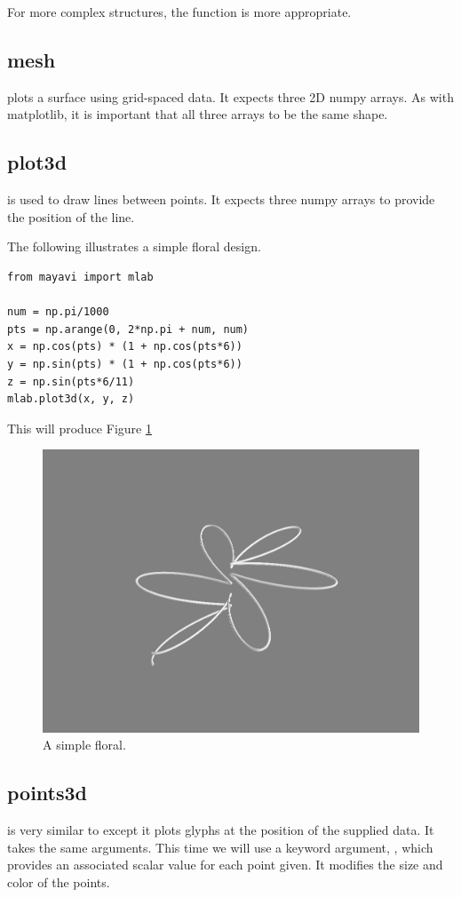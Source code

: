 For more complex structures, the  function is more appropriate. 

\subsection*{mesh}
 plots a surface using grid-spaced data. 
It expects three 2D numpy arrays. As with matplotlib, it is important that 
all three arrays to be the same shape. 

\subsection*{plot3d}
 is used to draw lines between points. It expects three numpy 
arrays to provide the position of the line. 

The following illustrates a simple floral design.
\begin{lstlisting}
from mayavi import mlab

num = np.pi/1000
pts = np.arange(0, 2*np.pi + num, num)
x = np.cos(pts) * (1 + np.cos(pts*6))
y = np.sin(pts) * (1 + np.cos(pts*6))
z = np.sin(pts*6/11)
mlab.plot3d(x, y, z)
\end{lstlisting}
This will produce Figure \ref{fig:plot3d}
\begin{figure} 
\includegraphics[width=\textwidth]{plot3d.png}
\caption{A simple floral.} 
\label{fig:plot3d}
\end{figure}


\subsection*{points3d}
 is very similar to  except it plots glyphs at the 
position of the supplied data. It takes the same arguments. This time we 
will use a keyword argument, , which provides an associated scalar 
value for each point given. It modifies the size and color of the points. 

